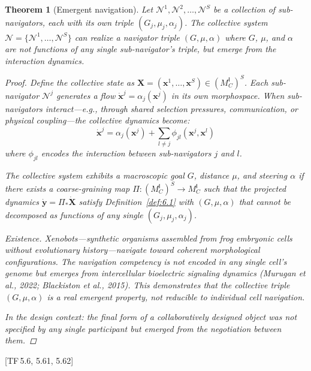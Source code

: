 \documentclass[11pt, a4paper]{article}
\theoremstyle{definition}
\theoremstyle{plain}
\newtheorem{theorem}[definition]{Theorem}
\theoremstyle{remark}
\newcommand{\MC}{M^{\mathsf{I}}_C}          %
\newcommand{\Nav}{\mathcal{N}}               %
\newcommand{\TF}[1]{\textnormal{[TF\,#1]}}  %
\begin{document}
\begin{theorem}[Emergent navigation]\label{thm:8.1}
Let $\Nav^1, \Nav^2, \ldots, \Nav^S$ be a collection of sub-navigators,
each with its own triple $(G_j, \mu_j, \alpha_j)$. The collective system
$\Nav = \{\Nav^1, \ldots, \Nav^S\}$ can realize a navigator triple
$(G, \mu, \alpha)$ where $G$, $\mu$, and $\alpha$ are \emph{not}
functions of any single sub-navigator's triple, but emerge from the
interaction dynamics.

\begin{proof}
Define the collective state as $\bm{X} = (\bm{x}^1, \ldots, \bm{x}^S)
\in {(\MC)}^S$. Each sub-navigator $\Nav^j$ generates a flow
$\dot{\bm{x}}^j = \alpha_j(\bm{x}^j)$ in its own morphospace.
When sub-navigators interact---e.g., through shared selection pressures,
communication, or physical coupling---the collective dynamics become:
\[
  \dot{\bm{x}}^j = \alpha_j(\bm{x}^j)
  + \sum_{l \neq j} \phi_{jl}(\bm{x}^j, \bm{x}^l)
\]
where $\phi_{jl}$ encodes the interaction between sub-navigators $j$
and $l$.

The collective system exhibits a macroscopic goal $G$, distance $\mu$,
and steering $\alpha$ if there exists a coarse-graining map
$\Pi : {(\MC)}^S \to \MC$ such that the projected dynamics
$\dot{\bm{y}} = \Pi_* \dot{\bm{X}}$ satisfy Definition~\ref{def:6.1}
with $(G, \mu, \alpha)$ that cannot be decomposed as functions of any
single $(G_j, \mu_j, \alpha_j)$.

\textit{Existence.}\;
Xenobots---synthetic organisms assembled from frog embryonic cells
without evolutionary history---navigate toward coherent morphological
configurations. The navigation competency is not encoded in any single
cell's genome but emerges from intercellular bioelectric signaling
dynamics (Murugan et al., 2022; Blackiston et al., 2015). This
demonstrates that the collective triple $(G, \mu, \alpha)$ is a real
emergent property, not reducible to individual cell navigation.

In the design context: the final form of a collaboratively designed
object was not specified by any single participant but emerged from the
negotiation between them. \qedhere
\end{proof}
\end{theorem}

\TF{5.6, 5.61, 5.62}


\newpage
\end{document}
